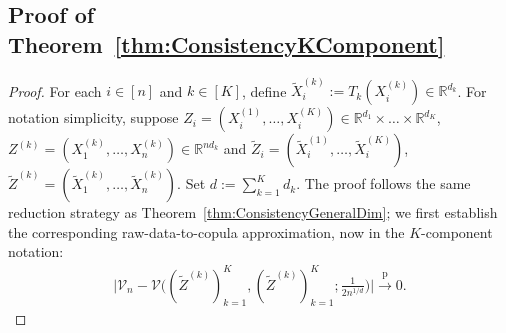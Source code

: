 \documentclass[11pt]{article}
\newcommand{\pto}{\xrightarrow{\,\mathrm{p}\,} }
\begin{document}
\subsection{Proof of Theorem~\ref{thm:ConsistencyKComponent}}
\begin{proof}
For each $i \in [n]$ and $k \in [K]$, define $\widetilde{X}_i^{(k)} := T_k(X_i^{(k)}) \in \mathbb{R}^{d_k}$. For notation simplicity, suppose $Z_i = (X_i^{(1)}, \ldots, X_i^{(K)}) \in \mathbb{R}^{d_1} \times \ldots \times \mathbb{R}^{d_K}$, $Z^{(k)} = (X_1^{(k)}, \ldots, X_n^{(k)}) \in \mathbb{R}^{nd_k}$ and $\widetilde{Z}_i = (\widetilde{X}_i^{(1)},\ldots, \widetilde{X}_i^{(K)})$, $\widetilde{Z}^{(k)}=(\widetilde{X}_1^{(k)},\ldots, \widetilde{X}_n^{(k)})$. Set $d := \sum_{k = 1}^K d_k$. The proof follows the same reduction strategy as Theorem~\ref{thm:ConsistencyGeneralDim}; we first establish the corresponding raw-data-to-copula approximation, now in the $K$-component notation:
\begin{align}
\biggl|\mathcal{V}_{n} - \mathcal{V}\biggl((\widetilde{Z}^{(k)})_{k = 1}^K, (\widetilde{Z}^{(k)})_{k = 1}^K; \frac{1}{2n^{1/d}} \biggr)\biggr| \pto 0. \label{eq:SelfReference} 
\end{align}


\end{proof}
\end{document}
